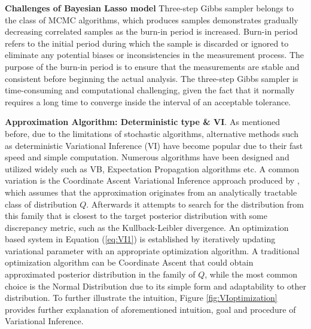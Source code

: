\textbf{Challenges of Bayesian Lasso model}
  Three-step Gibbs sampler belongs to the class of MCMC algorithms, which produces samples demonstrates gradually decreasing correlated samples as the burn-in period is increased. Burn-in period refers to the initial period during which the sample is discarded or ignored to eliminate any potential biases or inconsistencies in the measurement process. The purpose of the burn-in period is to ensure that the measurements are stable and consistent before beginning the actual analysis. The three-step Gibbs sampler is time-consuming and computational challenging, given the fact that it normally requires a long time to converge inside the interval of an acceptable tolerance.

\textbf{Approximation Algorithm: Deterministic type \& VI}.
 As mentioned before, due to the limitations of stochastic algorithms, alternative methods such as deterministic Variational Inference (VI) have become popular due to their fast speed and simple computation.
 Numerous algorithms have been designed and utilized widely such as VB, Expectation Propagation algorithms etc. A common variation is the Coordinate Ascent Variational Inference approach produced by \cite{Blei2003LDA}, which assumes that the approximation originates from an analytically tractable class of distribution $Q$. Afterwards it attempts to search for the distribution from this family that is closest to the target posterior distribution with some discrepancy metric, such as the Kullback-Leibler divergence. An optimization based system in Equation (\ref{eq:VI1}) is established by iteratively updating variational parameter with an appropriate optimization algorithm. A traditional optimization algorithm can be Coordinate Ascent that could obtain approximated posterior distribution in the family of $Q$, while the most common choice is the Normal Distribution due to its simple form and adaptability to other distribution.
 To further illustrate the intuition, Figure \ref{fig:VIoptimization} provides further explanation of aforementioned intuition, goal and procedure of Variational Inference.
 
